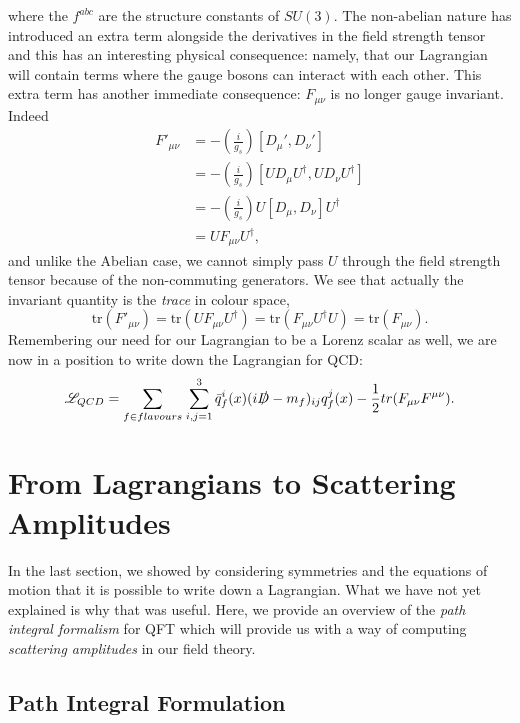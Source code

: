 where the $f^{abc}$ are the structure constants of $SU(3)$. The non-abelian nature has introduced an extra term alongside the derivatives in the field strength tensor and this has an interesting physical consequence: namely, that our Lagrangian will contain terms where the gauge bosons can interact with each other. This extra term has another immediate consequence: $F_{\mu \nu}$ is no longer gauge invariant. Indeed
\begin{equation}
\begin{split}
F'_{\mu \nu} &= -\left(\frac{i}{g_s} \right) [D_\mu', D_\nu'] \\
&= -\left(\frac{i}{g_s} \right) [U D_\mu U^\dagger, U D_\nu U^\dagger] \\
&= -\left(\frac{i}{g_s} \right) U [D_\mu, D_\nu]  U^\dagger \\
&=  U F_{\mu \nu}  U^\dagger,
\end{split}
\end{equation}
and unlike the Abelian case, we cannot simply pass $U$ through the field strength tensor because of the non-commuting generators. We see that actually the invariant quantity is the \emph{trace} in colour space,
\begin{equation}
\text{tr}(F'_{\mu \nu}) = \text{tr}(U F_{\mu \nu} U^\dagger) = \text{tr}(F_{\mu \nu}U^\dagger U) = \text{tr}(F_{\mu \nu}).
\end{equation}
Remembering our need for our Lagrangian to be a Lorenz scalar as well, we are now in a position to write down the Lagrangian for QCD:
\begin{equation}
\mathscr{L}_{QCD} = \sum_{f \in flavours} \hspace{1pt} \sum_{i,j = 1}^3 \bar{q}_f^i(x)(i \slashed{D} - m_f)_{ij}q^j_f(x) - \frac{1}{2}tr(F_{\mu \nu}F^{\mu \nu}).
\end{equation}

\section{From Lagrangians to Scattering Amplitudes}

In the last section, we showed by considering symmetries and the equations of motion that it is possible to write down a Lagrangian. What we have not yet explained is why that was useful. Here, we provide an overview of the \emph{path integral formalism} for QFT which will provide us with a way of computing \emph{scattering amplitudes} in our field theory. 

\subsection{Path Integral Formulation}

